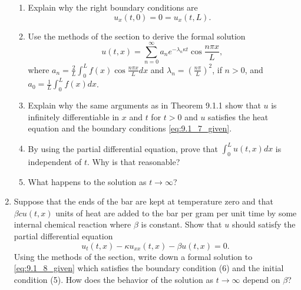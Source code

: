 \documentclass{article}
\begin{document}
\begin{enumerate}
            \begin{enumerate}
                  \item Explain why the right boundary conditions are
                        \begin{equation}
                              u_x(t,0) = 0 = u_x(t,L).
                              \label{eq:9.1_7_given}
                        \end{equation}
                  \item Use the methods of the section to derive the formal solution
                        \[
                              u(t,x)=\sum_{n=0}^\infty a_ne^{-\lambda_n\kappa t}\cos\frac{n\pi x}{L},
                        \]
                        where $a_n=\frac{2}{L}\int_0^L f(x)\cos\frac{n\pi x}{L}dx$ and
                        $\lambda_n=(\frac{n\pi}{L})^2$, if $n>0$, and
                        $a_0=\frac{1}{L}\int_0^L f(x)dx$.
                  \item Explain why the same arguments as in Theorem 9.1.1 show that $u$
                        is infinitely differentiable in $x$ and $t$ for $t>0$ and $u$ satisfies
                        the heat equation and the boundary conditions \eqref{eq:9.1_7_given}.
                  \item By using the partial differential equation, prove that
                        $\int_0^Lu(t,x)dx$ is independent of $t$. Why is that reasonable?
                  \item What happens to the solution as $t\to\infty$?
            \end{enumerate}
      \item Suppose that the ends of the bar are kept at temperature zero and that
            $\beta cu(t,x)$ units of heat are added to the bar per gram per unit time
            by some internal chemical reaction where $\beta$ is constant. Show that $u$
            should satisfy the partial differential equation
            \begin{equation}
                  u_t(t,x)-\kappa u_{xx}(t,x)-\beta u(t,x) = 0.
                  \label{eq:9.1_8_given}
            \end{equation}
            Using the methods of the section, write down a formal solution to
            \eqref{eq:9.1_8_given} which satisfies the boundary condition (6) and the
            initial condition (5). How does the behavior of the solution as $t\to\infty$
            depend on $\beta$?
\end{enumerate}
\end{document}
